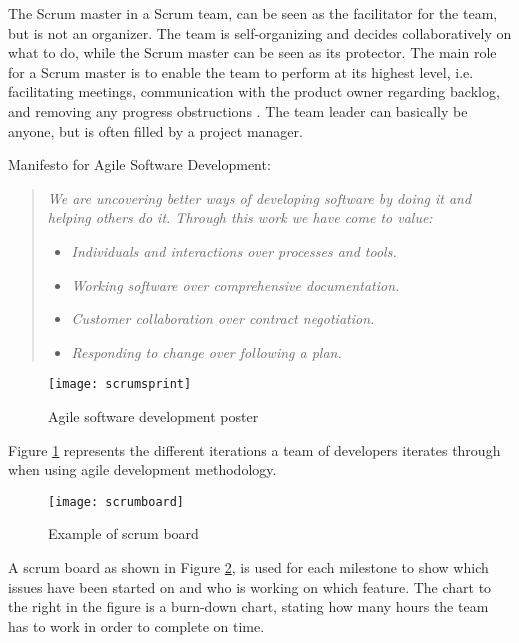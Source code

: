The Scrum master in a Scrum team, can be seen as the facilitator for the team, but is not an organizer. The team is self-organizing and decides collaboratively on what to do, while the Scrum master can be seen as its protector. The main role for a Scrum master is to enable the team to perform at its highest level, i.e. facilitating meetings, communication with the product owner regarding backlog, and removing any progress obstructions \citep{schwaber2002agile}. The team leader can basically be anyone, but is often filled by a project manager. 

Manifesto for Agile Software Development:\citep{agilemanifesto}
\begin{quotation}
\emph{We are uncovering better ways of developing software by doing it and helping others do it. Through this work we have come to value:}
\begin{itemize}
\item \emph{Individuals and interactions over processes and tools.}
\item \emph{Working software over comprehensive documentation.}
\item \emph{Customer collaboration over contract negotiation.}
\item \emph{Responding to change over following a plan.}
\end{itemize}
\end{quotation}

\begin{figure}[!htpb]
\centering
	\texttt{[image: scrumsprint]}
\caption{Agile software development poster \citep{scrumsprint}}
\label{scrumsprint}
\end{figure}

Figure \ref{scrumsprint} represents the different iterations a team of developers iterates through when using agile development methodology.

\begin{figure}[!htpb]
\centering
	\texttt{[image: scrumboard]}
\caption{Example of scrum board \citep{scrumboard}}
\label{scrumboard}
\end{figure}

A scrum board as shown in Figure \ref{scrumboard}, is used for each milestone to show which issues have been started on and who is working on which feature. The chart to the right in the figure is a burn-down chart, stating how many hours the team has to work in order to complete on time.
